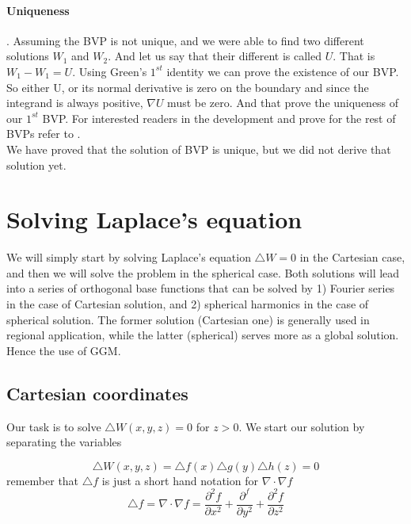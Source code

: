 \paragraph{Uniqueness}. Assuming the BVP is not unique, and we were able to find two different solutions $W_1$ and $W_2$. And let us say that their different is called $U$. That is $W_1 - W_1 = U$. Using Green's $1^{st}$ identity we can prove the existence of our BVP.
\\
So either U, or its normal derivative is zero on the boundary and since the integrand is always positive, $\nabla U$ must be zero.
And that prove the uniqueness of our $1^{st}$ BVP. For interested readers in the development and prove for the rest of BVPs refer to \cite{nico}.  
\\
We have proved that the solution of BVP is unique, but we did not derive that solution yet.

\section{Solving Laplace's equation}
We will simply start by solving Laplace's equation $\triangle W = 0$ in the Cartesian case, and then we will solve the problem in the spherical case. Both solutions will lead into a series of orthogonal base functions that can be solved by 1) Fourier series in the case of Cartesian solution, and 2) spherical harmonics in the case of spherical solution. The former solution (Cartesian one) is generally used in regional application, while the latter (spherical) serves more as a global solution. Hence the use of GGM.

\subsection{Cartesian coordinates}
Our task is to solve $\triangle W(x, y, z) = 0$ for $z > 0$. We start our solution by separating the variables

\begin{equation}
\triangle W(x, y, z) = \triangle f(x) \triangle g(y) \triangle h(z) = 0
\end{equation}
remember that $\triangle f$ is just a short hand notation for $\nabla \cdot \nabla f$
\begin{displaymath}
\triangle f = \nabla \cdot \nabla f = \frac{\partial^2 f}{\partial x^2} + \frac{\partial^f}{\partial y^2} + \frac{\partial^2 f}{\partial z^2}
\end{displaymath}

